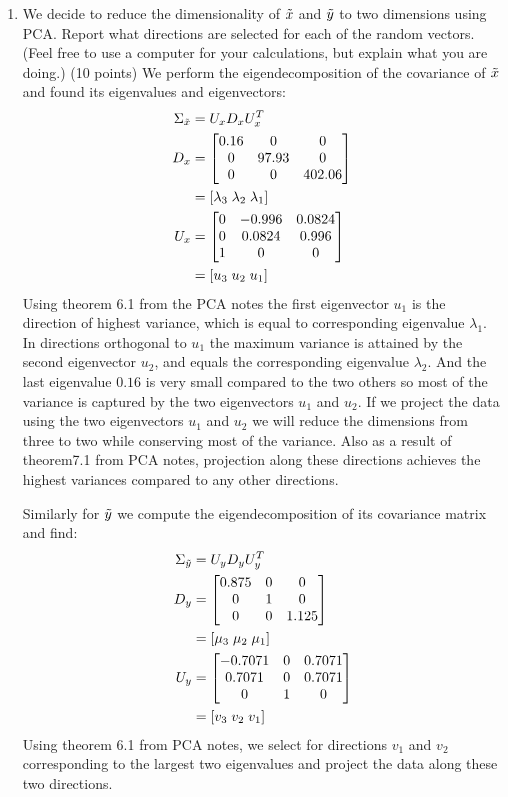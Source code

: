 \documentclass[11pt,twoside]{article}
\begin{document}
\begin{exam}
\begin{exercise}
\begin{problem}
\begin{enumerate}
\item We decide to reduce the dimensionality of $\tilde{  x }$ and $\tilde{  y }$ to two dimensions using PCA. Report what directions are selected for each of the random vectors. (Feel free to use a computer for your calculations, but explain what you are doing.)  (10 points)
We perform the eigendecomposition of the covariance of $\tilde{  x }$ and found its eigenvalues and eigenvectors:
\begin{align*}
	\Sigma_{\tilde{  x }}	&=	U_x D_x U_x^T \\
	D _x			&= \begin{bmatrix} 0.16 & 0  & 0 \\ 0 & 97.93  & 0 \\ 0 & 0 & 402.06 \end{bmatrix} \\
				&= [\lambda_3 \; \lambda_2 \; \lambda_1 ] \\
	U_x 			&= \begin{bmatrix}  0 & -0.996 &  0.0824 \\  0 & 0.0824 & 0.996 \\  1 & 0 & 0  \end{bmatrix} \\
				&= [u_3 \; u_2 \; u_1 ]
\end{align*}
Using theorem 6.1 from the PCA notes the first eigenvector $u_1$ is the direction of highest variance, which is equal to corresponding eigenvalue $\lambda_1$.
In directions orthogonal to $u_1$  the maximum variance is attained by the second eigenvector $u_2$, and equals the corresponding eigenvalue  $\lambda_2$.
And the last eigenvalue $0.16$ is very small compared to the two others  so most of the variance is captured by the two eigenvectors $u_1$ and $u_2$.
If we project the data using  the two eigenvectors $u_1$ and $u_2$ we will reduce the dimensions from three to two while conserving most of the variance.
Also as a result of theorem7.1 from PCA notes, projection along these directions achieves the highest variances compared to any other directions.

Similarly for $\tilde{  y }$ we compute the eigendecomposition of its covariance matrix and find:
\begin{align*}
	\Sigma_{\tilde{  y }}	&=	U_y D_y U_y^T \\
	D _y			&= \begin{bmatrix} 0.875 & 0  & 0 \\ 0 & 1  & 0 \\ 0 & 0 & 1.125 \end{bmatrix} \\
				&= [\mu_3 \; \mu_2 \; \mu_1 ] \\
	U_y			&= \begin{bmatrix}  -0.7071 & 0 &  0.7071 \\  0.7071 & 0 & 0.7071 \\  0 & 1 & 0  \end{bmatrix} \\
				&= [v_3 \; v_2 \; v_1 ]
\end{align*}
Using theorem 6.1 from PCA notes, we select for directions $v_1$ and $v_2$ corresponding to the largest two eigenvalues and project the data along these two directions.



\end{enumerate}
\end{problem}
\end{exercise}
\end{exam}
\end{document}
